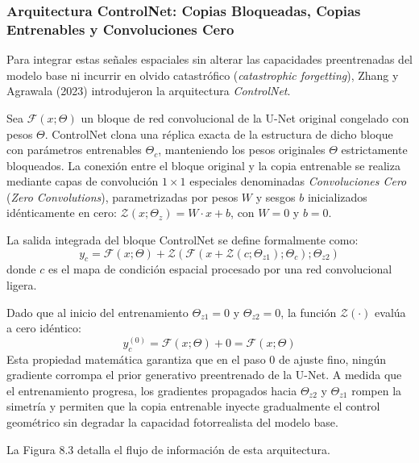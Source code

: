 \subsubsection{Arquitectura ControlNet: Copias Bloqueadas, Copias Entrenables y Convoluciones Cero}

Para integrar estas señales espaciales sin alterar las capacidades preentrenadas del modelo base ni incurrir en olvido catastrófico (\textit{catastrophic forgetting}), Zhang y Agrawala (2023) introdujeron la arquitectura \textit{ControlNet}.

Sea $\mathcal{F}(x; \Theta)$ un bloque de red convolucional de la U-Net original congelado con pesos $\Theta$. ControlNet clona una réplica exacta de la estructura de dicho bloque con parámetros entrenables $\Theta_c$, manteniendo los pesos originales $\Theta$ estrictamente bloqueados. La conexión entre el bloque original y la copia entrenable se realiza mediante capas de convolución $1 \times 1$ especiales denominadas \textit{Convoluciones Cero} (\textit{Zero Convolutions}), parametrizadas por pesos $W$ y sesgos $b$ inicializados idénticamente en cero: $\mathcal{Z}(x; \Theta_z) = W \cdot x + b$, con $W=0$ y $b=0$.

La salida integrada del bloque ControlNet se define formalmente como:
\begin{equation}
y_c = \mathcal{F}(x; \Theta) + \mathcal{Z}(\mathcal{F}(x + \mathcal{Z}(c; \Theta_{z1}); \Theta_c); \Theta_{z2})
\end{equation}
donde $c$ es el mapa de condición espacial procesado por una red convolucional ligera.

Dado que al inicio del entrenamiento $\Theta_{z1} = 0$ y $\Theta_{z2} = 0$, la función $\mathcal{Z}(\cdot)$ evalúa a cero idéntico:
\begin{equation}
y_c^{(0)} = \mathcal{F}(x; \Theta) + 0 = \mathcal{F}(x; \Theta)
\end{equation}
Esta propiedad matemática garantiza que en el paso $0$ de ajuste fino, ningún gradiente corrompa el prior generativo preentrenado de la U-Net. A medida que el entrenamiento progresa, los gradientes propagados hacia $\Theta_{z2}$ y $\Theta_{z1}$ rompen la simetría y permiten que la copia entrenable inyecte gradualmente el control geométrico sin degradar la capacidad fotorrealista del modelo base.

La Figura 8.3 detalla el flujo de información de esta arquitectura.

